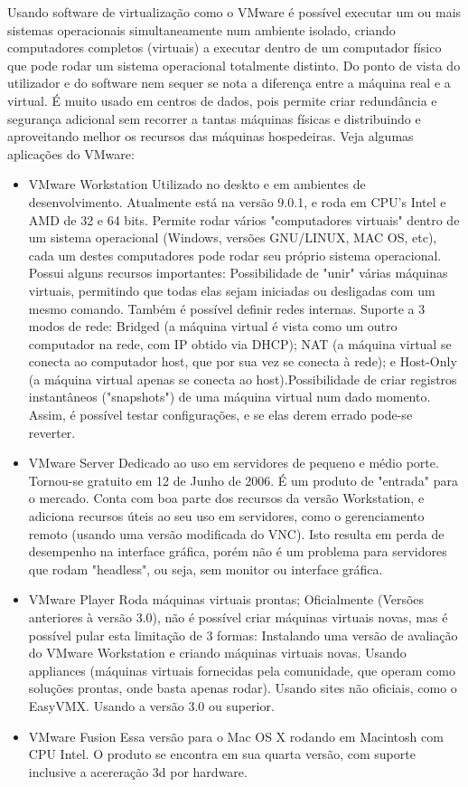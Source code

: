 Usando software de virtualização como o VMware é possível executar um ou mais sistemas operacionais simultaneamente num ambiente isolado, criando computadores completos (virtuais) a executar dentro de um computador físico que pode rodar um sistema operacional totalmente distinto. Do ponto de vista do utilizador e do software nem sequer se nota a diferença entre a máquina real e a virtual. É muito usado em centros de dados, pois permite criar redundância e segurança adicional sem recorrer a tantas máquinas físicas e distribuindo e aproveitando melhor os recursos das máquinas hospedeiras. Veja algumas aplicações do VMware:
\begin{itemize}
\item VMware Workstation
Utilizado no deskto e em ambientes de desenvolvimento. Atualmente está na versão 9.0.1, e roda em CPU's Intel e AMD de 32 e 64 bits. Permite rodar vários "computadores virtuais" dentro de um sistema operacional (Windows, versões GNU/LINUX, MAC OS, etc), cada um destes computadores pode rodar seu próprio sistema operacional. Possui alguns recursos importantes: Possibilidade de "unir" várias máquinas virtuais, permitindo que todas elas sejam iniciadas ou desligadas com um mesmo comando. Também é possível definir redes internas. Suporte a 3 modos de rede: Bridged (a máquina virtual é vista como um outro computador na rede, com IP obtido via DHCP); NAT (a máquina virtual se conecta ao computador host, que por sua vez se conecta à rede); e Host-Only (a máquina virtual apenas se conecta ao host).Possibilidade de criar registros instantâneos ("snapshots") de uma máquina virtual num dado momento. Assim, é possível testar configurações, e se elas derem errado pode-se reverter.
 \item VMware Server
 Dedicado ao uso em servidores de pequeno e médio porte. Tornou-se gratuito em 12 de Junho de 2006. É um produto de "entrada" para o mercado. Conta com boa parte dos recursos da versão Workstation, e adiciona recursos úteis ao seu uso em servidores, como o gerenciamento remoto (usando uma versão modificada do VNC). Isto resulta em perda de desempenho na interface gráfica, porém não é um problema para servidores que rodam "headless", ou seja, sem monitor ou interface gráfica.
\item VMware Player
Roda máquinas virtuais prontas; Oficialmente (Versões anteriores à versão 3.0), não é possível criar máquinas virtuais novas, mas é possível pular esta limitação de 3 formas: Instalando uma versão de avaliação do VMware Workstation e criando máquinas virtuais novas. Usando appliances (máquinas virtuais fornecidas pela comunidade, que operam como soluções prontas, onde basta apenas rodar). Usando sites não oficiais, como o EasyVMX. Usando a versão 3.0 ou superior.
\item VMware Fusion
Essa versão para o Mac OS X rodando em Macintosh com CPU Intel. O produto se encontra em sua quarta versão, com suporte inclusive a acereração 3d por hardware.
\end{itemize}


